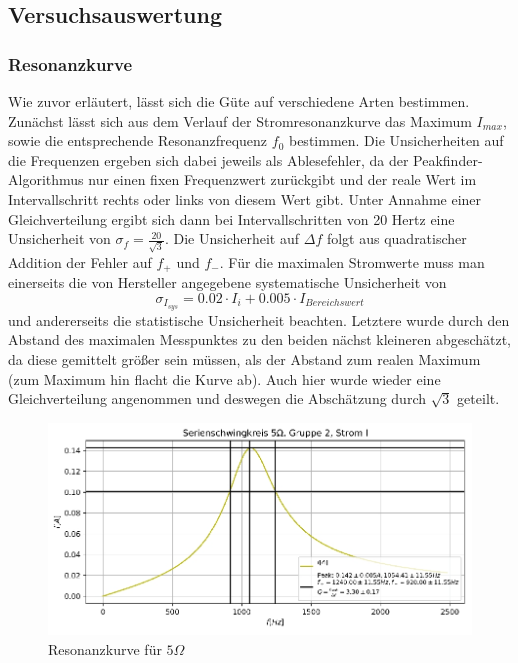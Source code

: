 \documentclass[a4paper, 11pt]{article}
\begin{document}
\subsection{Versuchsauswertung}
\subsubsection{Resonanzkurve}
Wie zuvor erläutert, lässt sich die Güte auf verschiedene Arten bestimmen. \\
Zunächst lässt sich aus dem Verlauf der Stromresonanzkurve das Maximum $I_{max}$, sowie die entsprechende Resonanzfrequenz $f_0$ bestimmen. \newline
Die Unsicherheiten auf die Frequenzen ergeben sich dabei jeweils als Ablesefehler, da der Peakfinder-Algorithmus nur einen fixen Frequenzwert zurückgibt und der reale Wert im Intervallschritt rechts oder links von diesem Wert gibt. Unter Annahme einer Gleichverteilung ergibt sich dann bei Intervallschritten von 20 Hertz eine Unsicherheit von $\sigma_f = \frac{20}{\sqrt{3}}$. Die Unsicherheit auf $\Delta f$ folgt aus quadratischer Addition der Fehler auf $f_+$ und $f_-$. \newline
Für die maximalen Stromwerte muss man einerseits die von Hersteller angegebene systematische Unsicherheit von \[ \sigma_{I_{sys}} = 0.02 \cdot I_i + 0.005 \cdot I_{Bereichswert} \] und andererseits die statistische Unsicherheit beachten. Letztere wurde durch den Abstand des maximalen Messpunktes zu den beiden nächst kleineren abgeschätzt, da diese gemittelt größer sein müssen, als der Abstand zum realen Maximum (zum Maximum hin flacht die Kurve ab). Auch hier wurde wieder eine Gleichverteilung angenommen und deswegen die Abschätzung durch $\sqrt{3}$ geteilt. \newline
\begin{figure}[H]
	\centering
	\includegraphics[trim = 0mm 0mm 0mm 0mm,clip, width=13cm]{Bilder/Selection_G2-5Ohm-I.jpg}%
	\caption[Resonanzkurve für $ 5 \Omega$]{Resonanzkurve für $ 5 \Omega$}%
	\label{pic:Abbildung 3}%
\end{figure}
\end{document}
